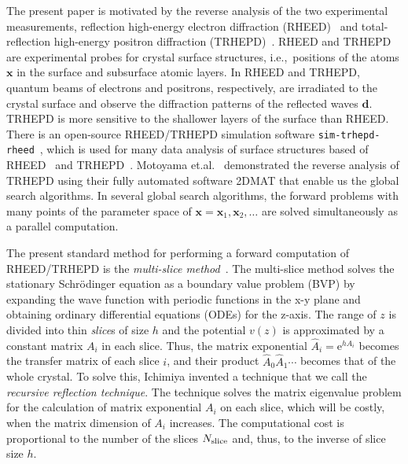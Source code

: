 \documentclass[preprint, 5p, times, sort&compress]{elsarticle}
\def\ee{\mathrm{e}}
\begin{document}
        The present paper is motivated by the reverse analysis of the two experimental measurements,
        reflection high-energy electron diffraction (RHEED)~\cite{Ichimiya2004} and
        total-reflection high-energy positron diffraction (TRHEPD)~\cite{Fukaya2019a,HUGENSCHMIDT_2016_SurfSciRep_rev}.
        RHEED and TRHEPD are experimental probes for crystal surface structures,
        i.e.,\ positions of the atoms $\bm{x}$ in the surface and subsurface atomic layers.
        In RHEED and TRHEPD, quantum beams of  electrons and positrons, respectively, are irradiated to the crystal surface and observe
        the diffraction patterns of the reflected waves $\bm{d}$.
        TRHEPD is more sensitive to the shallower layers of the surface than RHEED.
        There is an open-source RHEED\slash TRHEPD simulation software \texttt{sim-trhepd-rheed}~\cite{Hanada2022, str-github},
        which is used for 
        many data analysis of surface structures based of RHEED~\cite{RHEED_SURF_SCI_1993, RHEED_HIKITA_JVST_1993, RHEED-Kudo-SurfIntf-1994, RHEED-HANADA-SurfSci-1994, HANADA_PRB_1995,RHEED-YAMADA-PRL-1995,RHEED-OHTAKE-PRB-1999, RHEED-Miotto-ApplPhysLett-1999, RHEED-Ohtake-JCrysGrow-1999, RHEED-Ohtake-PRB60-1999, RHEED-RealTime-Ohtake-PRB60-1999, RHEED-Miotto-2000,RHEED-Ohtake-PRB-2001,RHEED-Ohtake-PRB-2002}
        and TRHEPD~\cite{TANAKA2020_ACTA_PHYS_POLO,  HOSHI2022_TRHEPD_SION,TANAKA_2023_JJAP,Motoyama2022,TSUJIKAWA_2022_MOLECULES, TSUJIKAWA_2022_PRB}.
        Motoyama et.al.~\cite{Motoyama2022} demonstrated the reverse analysis of TRHEPD
        using their fully automated software 2DMAT
        that enable us the global search algorithms.
        In several global search algorithms, the forward problems with many points of the parameter space of $\bm{x}=\bm{x}_1, \bm{x}_2, \ldots$ are solved simultaneously as a parallel computation. 

        The present standard method for performing a forward computation of RHEED\slash TRHEPD is the \emph{multi-slice method}~\cite{Ichimiya1983,Ichimiya2004}.
        The multi-slice method solves the stationary Schr\"{o}dinger equation as
        a boundary value problem (BVP) by expanding the wave function with periodic functions
        in the x-y plane and obtaining ordinary differential equations (ODEs) for the z-axis.
        The range of $z$ is divided into thin \emph{slice}s of size $h$
        and the potential $v(z)$ is approximated by a constant matrix $A_i$ in each slice.
        Thus, the matrix exponential $\hat{A}_i=\ee^{hA_i}$ becomes the transfer matrix of each slice $i$,
        and their product $\hat{A}_0 \hat{A}_1\cdots$ becomes that of the whole crystal.
        To solve this, Ichimiya invented a technique that we call the \emph{recursive reflection technique}. The technique solves the matrix eigenvalue problem for the calculation of matrix exponential $A_i$ on each slice, which will be costly, when the matrix dimension of $A_i$ increases. The computational cost is proportional to the number of the slices $N_{\rm slice}$ and, thus, to the inverse of slice size $h$. 
\end{document}
